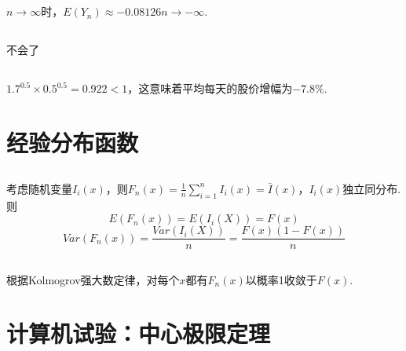 \documentclass{article}
\begin{document}
\begin{CJK}{UTF8}{gbsn}
\subsection{}
$n\to\infty$时，$E(Y_{n})\approx-0.08126n\to-\infty$.
\subsection{}
不会了
\subsection{}
$1.7^{0.5}\times0.5^{0.5}=0.922<1$，这意味着平均每天的股价增幅为$-7.8\%$.
\section{经验分布函数}
\subsection{}
考虑随机变量$I_{i}(x)$，则$F_{n}(x)=\frac{1}{n}\sum\limits_{i=1}^{n}I_{i}(x)=\bar{I}(x)$，$I_{i}(x)$独立同分布.
则
$$ E(F_{n}(x))=E(I_{i}(X))=F(x)$$
$$ Var(F_{n}(x))=\frac{Var(I_{i}(X))}{n}=\frac{F(x)(1-F(x))}{n}$$
\subsection{}
根据Kolmogrov强大数定律，对每个$x$都有$F_{n}(x)$以概率1收敛于$F(x)$.
\section{计算机试验：中心极限定理}

\end{CJK}
\end{document}

